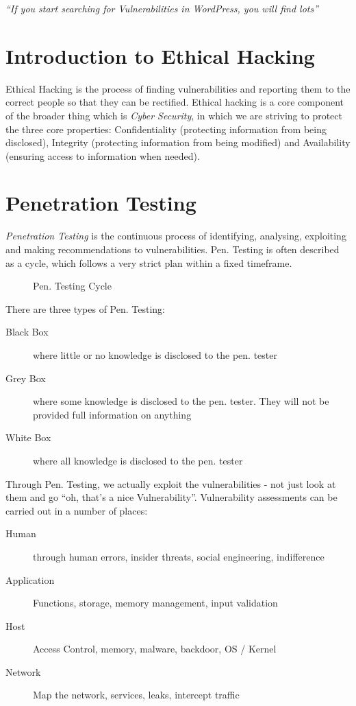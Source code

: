 
\textit{``If you start searching for Vulnerabilities in WordPress, you will find lots''}

\section{Introduction to Ethical Hacking}
Ethical Hacking is the process of finding vulnerabilities and reporting them to the correct people so that they can be rectified. Ethical hacking is a core component of the broader thing which is \textit{Cyber Security}, in which we are striving to protect the three core properties: Confidentiality (protecting information from being disclosed), Integrity (protecting information from being modified) and Availability (ensuring access to information when needed). 

\section{Penetration Testing}
\textit{Penetration Testing} is the continuous process of identifying, analysing, exploiting and making recommendations to vulnerabilities. Pen. Testing is often described as a cycle, which follows a very strict plan within a fixed timeframe. 
\begin{figure}[H]
    \centering
    \caption{Pen. Testing Cycle}    
\end{figure}
There are three types of Pen. Testing:
\begin{description}
    \item[Black Box] where little or no knowledge is disclosed to the pen. tester
    \item[Grey Box] where some knowledge is disclosed to the pen. tester. They will not be provided full information on anything
    \item[White Box] where all knowledge is disclosed to the pen. tester
\end{description}

Through Pen. Testing, we actually exploit the vulnerabilities - not just look at them and go ``oh, that's a nice Vulnerability''. Vulnerability assessments can be carried out in a number of places:
\begin{description}
    \item[Human] through human errors, insider threats, social engineering, indifference
    \item[Application] Functions, storage, memory management, input validation
    \item[Host] Access Control, memory, malware, backdoor, OS / Kernel
    \item[Network] Map the network, services, leaks, intercept traffic
\end{description}

